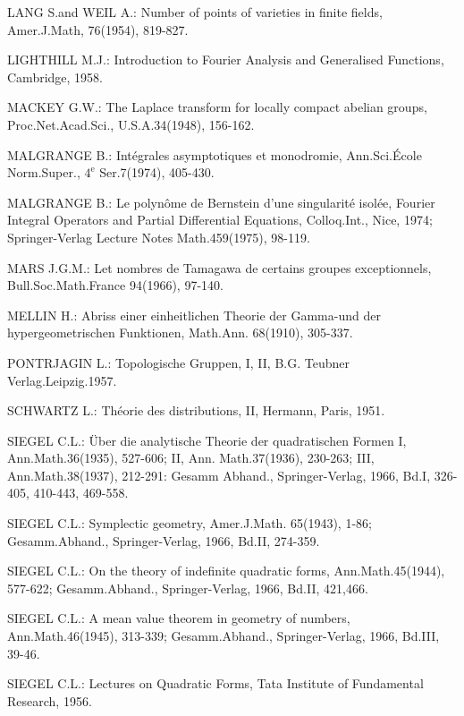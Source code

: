 \begin{thebibliography}{99}
 LANG S.\@\pageoriginale and WEIL A.: Number of points of
  varieties in finite fields, Amer.\@ J.\@ Math, 76(1954), 819-827.

 LIGHTHILL M.J.: Introduction to Fourier Analysis and
  Generalised Functions, Cambridge, 1958.

 MACKEY G.W.: The Laplace transform for locally compact
  abelian groups, Proc.\@ Net.\@ Acad.\@ Sci., U.S.A.\@ 34(1948), 156-162.

 MALGRANGE B.: Int\'egrales asymptotiques et
  monodromie, Ann.\@ Sci.\@ \'Ecole Norm.\@ Super., $4^{\text{e}}$
  Ser.\@ 7(1974), 405-430.

 MALGRANGE B.: Le polyn\^ome de Bernstein d'une
  singularit\'e isol\'ee, Fourier Integral Operators and Partial
  Differential Equations, Colloq.\@ Int., Nice, 1974; Springer-Verlag
  Lecture Notes Math.\@ 459(1975), 98-119.

 MARS J.G.M.: Let nombres de Tamagawa de certains groupes
  exceptionnels, Bull.\@ Soc.\@ Math.\@ France 94(1966), 97-140.

 MELLIN H.: Abriss einer einheitlichen Theorie der
  Gamma-und der hypergeometrischen Funktionen, Math.\@ Ann.\@
  68(1910), 305-337.

 PONTRJAGIN L.: Topologische Gruppen, I, II, B.G.\@
  Teubner Verlag.\@ Leipzig.\@ 1957.

 SCHWARTZ L.: Th\'eorie des distributions, II, Hermann,
  Paris, 1951.

 SIEGEL C.L.: \"Uber die analytische Theorie der
  quadratischen Formen I, Ann.\@ Math.\@ 36(1935), 527-606; II, Ann.\@
  Math.\@ 37(1936), 230-263; III, Ann.\@ Math.\@ 38(1937), 212-291:
  Gesamm Abhand., Springer-Verlag, 1966, Bd.I, 326-405, 410-443, 469-558.

 SIEGEL C.L.: Symplectic geometry, Amer.\@ J.\@ Math.\@
  65(1943), 1-86; Gesamm.\@ Abhand., Springer-Verlag, 1966, Bd.II, 274-359.

 SIEGEL C.L.: On the theory of indefinite quadratic
  forms, Ann.\@ Math.\@ 45(1944), 577-622; Gesamm.\@ Abhand.,
  Springer-Verlag, 1966, Bd.II, 421,466.

 SIEGEL C.L.: A mean value theorem in geometry of
  numbers, Ann.\@ Math.\@ 46(1945), 313-339; Gesamm.\@ Abhand.,
  Springer-Verlag, 1966, Bd.III, 39-46.

 SIEGEL C.L.: Lectures on Quadratic Forms, Tata
  Institute of Fundamental Research, 1956.


\end{thebibliography}
